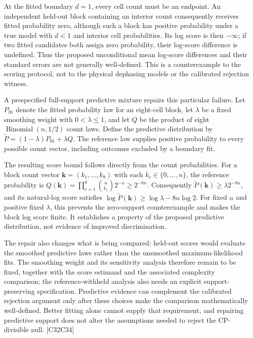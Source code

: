 \documentclass[11pt]{article}
\begin{document}
At the fitted boundary $d=1$, every cell count must be an endpoint. An independent held-out block containing an interior count consequently receives fitted probability zero, although such a block has positive probability under a true model with $d<1$ and interior cell probabilities. Its log score is then $-\infty$; if two fitted candidates both assign zero probability, their log-score difference is undefined. Thus the proposed unconditional mean log-score differences and their standard errors are not generally well-defined. This is a counterexample to the scoring protocol, not to the physical dephasing models or the calibrated rejection witness.

A prespecified full-support predictive mixture repairs this particular failure. Let $P_{\mathrm{fit}}$ denote the fitted probability law for an eight-cell block, let $\lambda$ be a fixed smoothing weight with $0<\lambda\leq1$, and let $Q$ be the product of eight $\operatorname{Binomial}(n,1/2)$ count laws. Define the predictive distribution by $\widetilde P=(1-\lambda)P_{\mathrm{fit}}+\lambda Q$. The reference law supplies positive probability to every possible count vector, including outcomes excluded by a boundary fit.

The resulting score bound follows directly from the count probabilities. For a block count vector $\mathbf{k}=(k_1,\ldots,k_8)$ with each $k_c\in\{0,\ldots,n\}$, the reference probability is $Q(\mathbf{k})=\prod_{c=1}^{8}\binom{n}{k_c}2^{-n}\geq2^{-8n}$. Consequently $\widetilde P(\mathbf{k})\geq\lambda2^{-8n}$, and its natural-log score satisfies $\log\widetilde P(\mathbf{k})\geq\log\lambda-8n\log2$. For fixed $n$ and positive fixed $\lambda$, this prevents the zero-support counterexample and makes the block log score finite. It establishes a property of the proposed predictive distribution, not evidence of improved discrimination.

The repair also changes what is being compared: held-out scores would evaluate the smoothed predictive laws rather than the unsmoothed maximum-likelihood fits. The smoothing weight and its sensitivity analysis therefore remain to be fixed, together with the score estimand and the associated complexity comparison; the reference-withheld analysis also needs an explicit support-preserving specification. Predictive evidence can complement the calibrated rejection argument only after these choices make the comparison mathematically well-defined. Better fitting alone cannot supply that requirement, and repairing predictive support does not alter the assumptions needed to reject the CP-divisible null. [C32\textendash{}\allowbreak{}C34]
\end{document}
